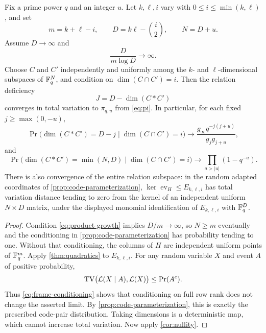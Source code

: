 \begin{theorem}
\label{thm:conditional-products}
Fix a prime power $q$ and an integer $u$.  Let $k,\ell,i$ vary with
$0\le i\le\min(k,\ell)$, and set
\[
 m=k+\ell-i,\qquad D=k\ell-\binom i2,\qquad N=D+u.
\]
Assume $D\to\infty$ and
\begin{equation}\label{eq:product-growth}
 \frac{D}{m\log D}\longrightarrow\infty.
\end{equation}
Choose $C$ and $C'$ independently and uniformly among the
$k$- and $\ell$-dimensional subspaces of $\mathbb F_q^N$, and condition on
$\dim(C\cap C')=i$.  Then the relation deficiency
\[
 J=D-\dim(C*C')
\]
converges in total variation to $\pi_{q,u}$ from \eqref{eq:pi}.
In particular, for each fixed $j\ge\max(0,-u)$,
\begin{equation}\label{eq:conditional-product-law}
 \Pr\bigl(\dim(C*C')=D-j\mid\dim(C\cap C')=i\bigr)
 \longrightarrow
 \frac{g_\infty q^{-j(j+u)}}{g_jg_{j+u}},
\end{equation}
and
\begin{equation}\label{eq:conditional-product-maximal}
 \Pr\bigl(\dim(C*C')=\min(N,D)\mid\dim(C\cap C')=i\bigr)
 \longrightarrow \prod_{a>|u|}(1-q^{-a}).
\end{equation}
There is also convergence of the entire relation subspace: in the
random adapted coordinates of \cref{prop:code-parameterization},
$\ker\operatorname{ev}_H\le E_{k,\ell,i}$ has total variation distance
tending to zero from the kernel of an independent uniform $N\times D$
matrix, under the displayed monomial identification of
$E_{k,\ell,i}$ with $\mathbb F_q^D$.
\end{theorem}

\begin{proof}
Condition \eqref{eq:product-growth} implies $D/m\to\infty$, so $N\ge m$
eventually and the conditioning in \cref{prop:code-parameterization}
has probability tending to one.  Without that conditioning, the
columns of $H$ are independent uniform points of $\mathbb F_q^m$.
Apply \cref{thm:quadratics} to $E_{k,\ell,i}$.  For any random variable
$X$ and event $A$ of positive probability,
\[
 \operatorname{TV}\bigl(\mathcal L(X\mid A),\mathcal L(X)\bigr)\le\Pr(A^c).
\]
Thus \eqref{eq:frame-conditioning} shows that conditioning on full row
rank does not change the asserted limit.  By
\cref{prop:code-parameterization}, this is exactly the prescribed
code-pair distribution.  Taking dimensions is a deterministic map,
which cannot increase total variation.  Now apply \cref{cor:nullity}.
\end{proof}

